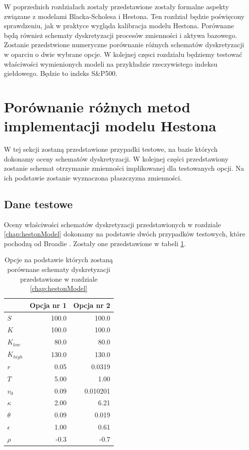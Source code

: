 \documentclass{pracamgr}
\begin{document}
W poprzednich rozdziałach zostały przedstawione zostały formalne aspekty związane z modelami 
Blacka-Scholesa i Hestona.
Ten rozdział będzie poświęcony sprawdzeniu, jak w praktyce wygląda kalibracja modelu Hestona.
Porównane będą również schematy dyskretyzacji procesów zmienności i aktywa bazowego.
Zostanie przedstwione numeryczne porównanie różnych schematów dyskretyzacji w oparciu
o dwie wybrane opcje.
W kolejnej częsci rozdziału będziemy testować właściwości wymienionych modeli na przykładzie 
rzeczywistego indeksu giełdowego.
Będzie to indeks S\&P500. 



\section{Porównanie różnych metod implementacji modelu Hestona}
W tej sekcji zostaną przedstawione przypadki testowe, na bazie których dokonamy
oceny schematów dyskretyzacji. W kolejnej części przedstawiony zostanie schemat 
otrzymanie zmienności implikowanej dla testowanych opcji. Na ich podstawie zostanie
wyznaczona płaszczyzna zmienności. 

\subsection{Dane testowe}
Oceny właściwości schematów dyskretyzacji przedstawionych w rozdziale \ref{chap:hestonModel}
dokonamy na podstawie dwóch przypadków testowych, które pochodzą od 
Broadie \cite{Broadie}.
Zostały one przedstawione w tabeli \ref{tab:testOptionsComparison}.

\begin{table}[htbp]
\centering
\begin{tabular}{l r r}
\toprule
{} & Opcja nr 1 & Opcja nr 2  \\
\midrule
  $S$         & 100.0 & 100.0 \\
  $K$         & 100.0 & 100.0 \\
  $K_{low}$   & 80.0 & 80.0 \\
  $K_{high}$  & 130.0 & 130.0 \\
  $r$         & 0.05 & 0.0319 \\
  $T$         & 5.00 & 1.00 \\
  $v_0$         & 0.09 & 0.010201 \\
  $\kappa$    & 2.00 & 6.21 \\
  $\theta$    & 0.09 & 0.019 \\
  $\epsilon$  & 1.00 & 0.61 \\
  $\rho$      & -0.3 & -0.7 \\
\bottomrule
\end{tabular}
\caption{Opcje na podstawie których zostaną porównane schematy dyskretyzacji przedstawione
w rozdziale \ref{chap:hestonModel} \cite{Broadie}}
\label{tab:testOptionsComparison}
\end{table}
\end{document}
